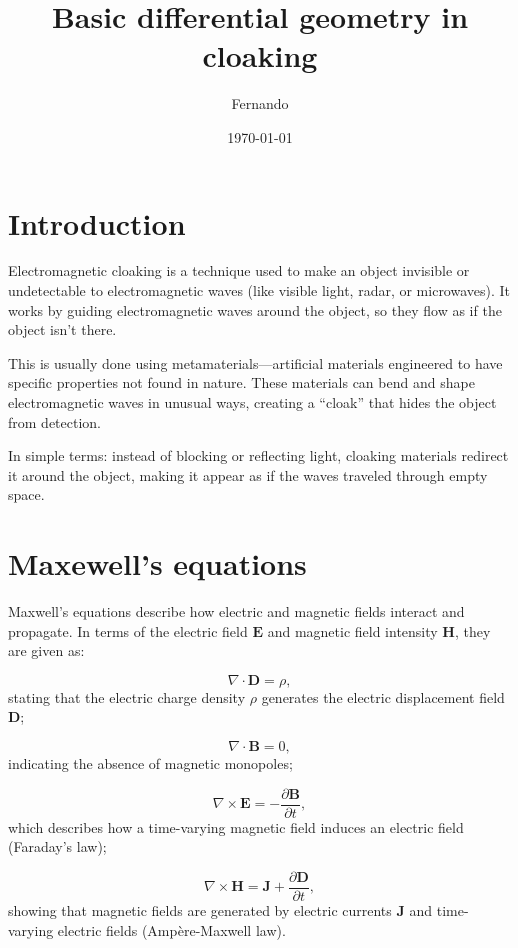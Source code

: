 \documentclass{amsart}
\begin{document}
\newcommand{\R}{\mathbb{R}}
\newcommand\tbf[1]{\textbf{#1}}
\newcommand\myworries[1]{\textcolor{red}{\tbf{#1}}}

\title{Basic differential geometry in cloaking}
\author{Fernando}
\date{\today}
\maketitle

\section{Introduction}
Electromagnetic cloaking is a technique used to make an object invisible or undetectable to electromagnetic waves (like visible light, radar, or microwaves). It works by guiding electromagnetic waves around the object, so they flow as if the object isn’t there.

This is usually done using metamaterials—artificial materials engineered to have specific properties not found in nature. These materials can bend and shape electromagnetic waves in unusual ways, creating a “cloak” that hides the object from detection.

In simple terms: instead of blocking or reflecting light, cloaking materials redirect it around the object, making it appear as if the waves traveled through empty space.

\section{Maxewell's equations}

Maxwell's equations describe how electric and magnetic fields interact and propagate. 
In terms of the electric field \(\mathbf{E}\) and magnetic field intensity \(\mathbf{H}\), 
they are given as:

\[
\nabla \cdot \mathbf{D} = \rho,
\]
stating that the electric charge density \(\rho\) generates the electric displacement field \(\mathbf{D}\);

\[
\nabla \cdot \mathbf{B} = 0,
\]
indicating the absence of magnetic monopoles;

\[
\nabla \times \mathbf{E} = -\frac{\partial \mathbf{B}}{\partial t},
\]
which describes how a time-varying magnetic field induces an electric field (Faraday's law);

\[
\nabla \times \mathbf{H} = \mathbf{J} + \frac{\partial \mathbf{D}}{\partial t},
\]
showing that magnetic fields are generated by electric currents \(\mathbf{J}\) 
and time-varying electric fields (Ampère-Maxwell law).
\end{document}
